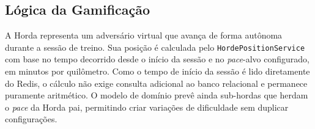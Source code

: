\subsection{Lógica da Gamificação}

A Horda representa um adversário virtual que avança de forma autônoma durante a sessão de treino. Sua posição é calculada pelo \texttt{HordePositionService} com base no tempo decorrido desde o início da sessão e no \textit{pace}-alvo configurado, em minutos por quilômetro. Como o tempo de início da sessão é lido diretamente do Redis, o cálculo não exige consulta adicional ao banco relacional e permanece puramente aritmético. O modelo de domínio prevê ainda sub-hordas que herdam o \textit{pace} da Horda pai, permitindo criar variações de dificuldade sem duplicar configurações.

